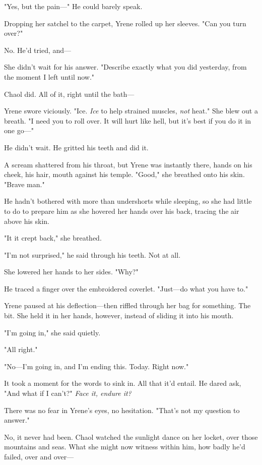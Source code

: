 "Yes, but the pain---" He could barely speak.

Dropping her satchel to the carpet, Yrene rolled up her sleeves. "Can you turn over?"

No. He'd tried, and---

She didn't wait for his answer. "Describe exactly what you did yesterday, from the moment I left until now."

Chaol did. All of it, right until the bath---

Yrene swore viciously. "Ice. \emph{Ice} to help strained muscles,
\emph{not} heat." She blew out a breath. "I need you to roll over. It will hurt like hell, but it's best if you do it in one go---"

He didn't wait. He gritted his teeth and did it.

A scream shattered from his throat, but Yrene was instantly there, hands on his cheek, his hair, mouth against his temple. "Good," she breathed onto his skin. "Brave man."

He hadn't bothered with more than undershorts while sleeping, so she had little to do to prepare him as she hovered her hands over his back, tracing the air above his skin.

"It  it crept back," she breathed.

"I'm not surprised," he said through his teeth. Not at all.

She lowered her hands to her sides. "Why?"

He traced a finger over the embroidered coverlet. "Just---do what you have to."

Yrene paused at his deflection---then riffled through her bag for something. The bit. She held it in her hands, however, instead of sliding it into his mouth.

"I'm going in," she said quietly.

"All right."

"No---I'm going in, and I'm ending this. Today. Right now."

It took a moment for the words to sink in. All that it'd entail. He dared ask, "And what if I can't?" \emph{Face it, endure it?}

There was no fear in Yrene's eyes, no hesitation. "That's not my question to answer."

No, it never had been. Chaol watched the sunlight dance on her locket, over those mountains and seas. What she might now witness within him, how badly he'd failed, over and over---

